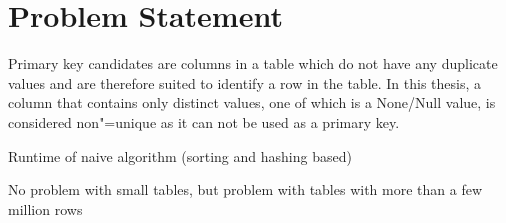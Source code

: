 \chapter{Problem Statement}\label{chap:problem_statement} %
Primary key candidates are columns in a table which do not have any duplicate values and are therefore suited to identify a row in the table. In this thesis, a column that contains only distinct values, one of which is a None/Null value, is considered non"=unique as it can not be used as a primary key.  %

Runtime of naive algorithm (sorting and hashing based)

No problem with small tables, but problem with tables with more than a few million rows